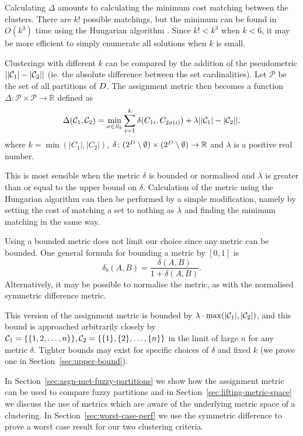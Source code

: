 Calculating $\Delta$ amounts to calculating the minimum cost matching between
the clusters.  There are $k!$ possible matchings, but the minimum can be found
in $O(k^3)$ time using the Hungarian algorithm \cite{kuhn1955hungarian}.
Since $k! < k^3$ when $k < 6$, it may be more efficient to simply enumerate
all solutions when $k$ is small.

Clusterings with different $k$ can be compared by the addition of the
pseudometric $||\mathcal{C}_1|-|\mathcal{C}_2||$ (ie. the absolute difference between the
set cardinalities).  Let $\mathcal{P}$ be the set of all partitions of
$D$.  The assignment metric then becomes a function $\Delta \colon
\mathcal{P} \times \mathcal{P} \to \mathbb{R}$ defined as
\begin{equation*}
  \Delta(\mathcal{C}_1, \mathcal{C}_2)
  = \min_{\sigma \in S_k} \sum_{i=1}^{k} \delta(C_{1i},C_{2\sigma(i)})
  + \lambda ||\mathcal{C}_1|-|\mathcal{C}_2||,
\end{equation*}
where $k = \min(|C_1|,|C_2|)$, $\delta \colon (2^{D}\setminus \emptyset)
\times (2^{D}\setminus \emptyset) \to \mathbb{R}$ and $\lambda$ is a
positive real number.

This is most sensible when the metric $\delta$ is bounded or normalised and
$\lambda$ is greater than or equal to the upper bound on $\delta$.
Calculation of the metric using the Hungarian algorithm can then be performed
by a simple modification, namely by setting the cost of matching a set to
nothing as $\lambda$ and finding the minimum matching in the same way.

Using a bounded metric does not limit our choice since any metric can be
bounded.  One general formula for bounding a metric by $[0,1]$ is
\begin{equation}
  \label{eq:met-bound}
  \delta_b (A,B) = \frac{\delta(A,B)}{1+\delta(A,B)}.
\end{equation}
Alternatively, it may be possible to normalise the metric, as with the
normalised symmetric difference metric.

This version of the assignment metric is bounded by $\lambda \cdot
\max(|\mathcal{C}_1|,|\mathcal{C}_2|)$, and this bound is approached arbitrarily closely
by $\mathcal{C}_1 = \{\{1,2,\dotsc,n\}\}, \mathcal{C}_2 = \{\{1\},\{2\},\dotsc,\{n\}\}$ in
the limit of large $n$ for any metric $\delta$.  Tighter bounds may exist for
specific choices of $\delta$ and fixed $k$ (we prove one in
Section~\ref{sec:upper-bound}).

In Section~\ref{sec:asgn-met-fuzzy-partitions} we show how the assignment
metric can be used to compare fuzzy partitions and in
Section~\ref{sec:lifting-metric-space} we discuss the use of metrics which are
aware of the underlying metric space of a clustering.  In
Section~\ref{sec:worst-case-perf} we use the symmetric difference to prove a
worst case result for our two clustering criteria.

